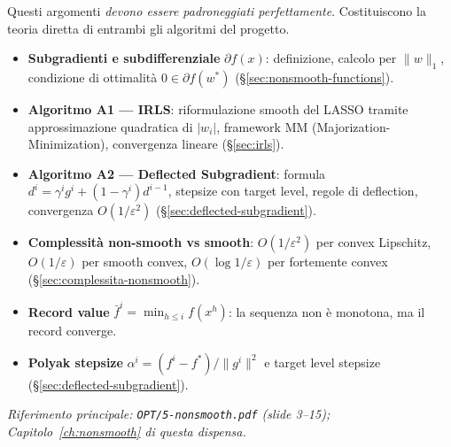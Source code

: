 \documentclass[11pt, a4paper, twoside]{book}
\theoremstyle{definition}
\theoremstyle{plain}
\theoremstyle{remark}
\begin{document}
\begin{center}
\end{center}

\vspace{0.3cm}

\begin{tcolorbox}[enhanced, colback=red!8, colframe=red!60,
  title={\textbf{Livello 1 — Core Ottimizzazione (critici per il progetto)}},
  fonttitle=\bfseries, breakable]
Questi argomenti \emph{devono essere padroneggiati perfettamente}. Costituiscono la teoria
diretta di entrambi gli algoritmi del progetto.
\begin{itemize}
  \item \textbf{Subgradienti e subdifferenziale} $\partial f(x)$: definizione, calcolo per $\|w\|_1$,
        condizione di ottimalità $0 \in \partial f(w^*)$ (\S\ref{sec:nonsmooth-functions}).
  \item \textbf{Algoritmo A1 — IRLS}: riformulazione smooth del LASSO tramite approssimazione quadratica
        di $|w_i|$, framework MM (Majorization-Minimization), convergenza lineare (\S\ref{sec:irls}).
  \item \textbf{Algoritmo A2 — Deflected Subgradient}: formula $d^i = \gamma^i g^i + (1{-}\gamma^i)d^{i-1}$,
        stepsize con target level, regole di deflection, convergenza $O(1/\varepsilon^2)$
        (\S\ref{sec:deflected-subgradient}).
  \item \textbf{Complessità non-smooth vs smooth}: $O(1/\varepsilon^2)$ per convex Lipschitz,
        $O(1/\varepsilon)$ per smooth convex, $O(\log 1/\varepsilon)$ per fortemente convex
        (\S\ref{sec:complessita-nonsmooth}).
  \item \textbf{Record value} $\bar{f}^i = \min_{h \leq i} f(x^h)$: la sequenza non è monotona, ma il
        record converge.
  \item \textbf{Polyak stepsize} $\alpha^i = (f^i - f^*)/\|g^i\|^2$ e target level stepsize (\S\ref{sec:deflected-subgradient}).
\end{itemize}
\textit{Riferimento principale: \texttt{OPT/5-nonsmooth.pdf} (slide 3–15); Capitolo~\ref{ch:nonsmooth} di questa dispensa.}
\end{tcolorbox}
\end{document}
